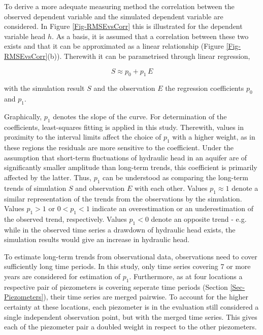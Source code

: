To derive a more adequate measuring method the correlation between the observed dependent variable and the simulated dependent variable are considered. 
In Figure \ref{Fig-RMSEvsCorr} this is illustrated for the dependent variable head $h$. 
As a basis, it is assumed that a correlation between these two exists and that it can be approximated as a linear relationship (Figure \ref{Fig-RMSEvsCorr}(b)). 
Therewith it can be parametrised through linear regression,

\begin{equation}
    \label{Eq-ErrMethLinReg}
    S \approx p_0 + p_1 \, E
\end{equation}

\noindent with the simulation result $S$ and the observation $E$ the regression coefficients $p_0$ and $p_1$.

Graphically, $p_1$ denotes the slope of the curve. 
For determination of the coefficients, least-squares fitting is applied in this study. 
Therewith, values in proximity to the interval limits affect the choice of $p_1$ with a higher weight, as in these regions the residuals are more sensitive to the coefficient. 
Under the assumption that short-term fluctuations of hydraulic head in an aquifer are of significantly smaller amplitude than long-term trends, this coefficient is primarily affected by the latter. 
Thus, $p_1$ can be understood as comparing the long-term trends of simulation $S$ and observation $E$ with each other. 
Values $p_1 \approx 1$ denote a similar representation of the trends from the observations by the simulation. 
Values $p_1 > 1$ or $0 < p_1 < 1$ indicate an overestimation or an underestimation of the observed trend, respectively. 
Values $p_1 < 0$ denote an opposite trend - e.g. while in the observed time series a drawdown of hydraulic head exists, the simulation results would give an increase in hydraulic head.


To estimate long-term trends from observational data, observations need to cover sufficiently long time periods. 
In this study, only time series covering 7 or more years are considered for estimation of $p_1$. 
Furthermore, as at four locations a respective pair of piezometers is covering seperate time periods (Section \ref{Sec-Piezometers}), their time series are merged pairwise. 
To account for the higher certainty at these locations, each piezometer is in the evaluation still considered a single independent observation point, but with the merged time series. 
This gives each of the piezometer pair a doubled weight in respect to the other piezometers.

